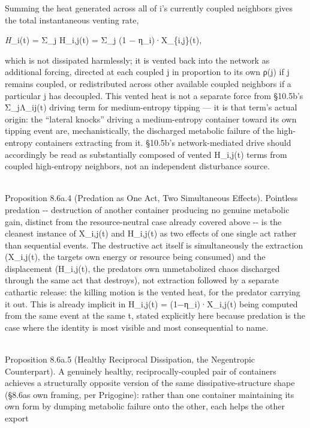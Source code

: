 \documentclass[
]{article}
\begin{document}
Summing the heat generated across all of i's currently coupled neighbors
gives the total instantaneous venting rate,

\emph{H}\_i(t) = Σ\_j H\_i,j(t) = Σ\_j (1 − η\_i)·X\_\{i,j\}(t),

which is not dissipated harmlessly; it is vented back into the network
as additional forcing, directed at each coupled j in proportion to its
own ρ(j) if j remains coupled, or redistributed across other available
coupled neighbors if a particular j has decoupled. This vented heat is
not a separate force from §10.5b's Σ\_jΛ\_ij(t) driving term for
medium-entropy tipping --- it is that term's actual origin: the
``lateral knocks'' driving a medium-entropy container toward its own
tipping event are, mechanistically, the discharged metabolic failure of
the high-entropy containers extracting from it. §10.5b's
network-mediated drive should accordingly be read as substantially
composed of vented H\_i,j(t) terms from coupled high-entropy neighbors,
not an independent disturbance source.\\
\strut \\
Proposition 8.6a.4 (Predation as One Act, Two Simultaneous Effects).
Pointless predation -\/- destruction of another container producing no
genuine metabolic gain, distinct from the resource-neutral case already
covered above -\/- is the cleanest instance of X\_i,j(t) and H\_i,j(t)
as two effects of one single act rather than sequential events. The
destructive act itself is simultaneously the extraction (X\_i,j(t), the
target\textquotesingle s own energy or resource being consumed) and the
displacement (H\_i,j(t), the predator\textquotesingle s own
unmetabolized chaos discharged through the same act that destroys), not
extraction followed by a separate cathartic release: the killing motion
is the vented heat, for the predator carrying it out. This is already
implicit in H\_i,j(t) = (1−η\_i)·X\_i,j(t) being computed from the same
event at the same t, stated explicitly here because predation is the
case where the identity is most visible and most consequential to
name.\\
\strut \\
Proposition 8.6a.5 (Healthy Reciprocal Dissipation, the Negentropic
Counterpart). A genuinely healthy, reciprocally-coupled pair of
containers achieves a structurally opposite version of the same
dissipative-structure shape (§8.6a\textquotesingle s own framing, per
Prigogine): rather than one container maintaining its own form by
dumping metabolic failure onto the other, each helps the other export
\end{document}
